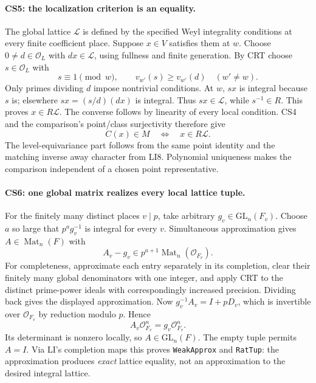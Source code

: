 \documentclass[11pt,a4paper]{article}
\numberwithin{equation}{section}
\theoremstyle{remark}\newtheorem{remark}[theorem]{Remark}
\begin{document}
\paragraph{CS5: the localization criterion is an equality.}
The global lattice $\mathcal L$ is defined by the specified Weyl
integrality conditions at every finite coefficient place. Suppose
$x\in V$ satisfies them at $w$. Choose $0\ne d\in\mathcal O_L$
with $dx\in\mathcal L$, using fullness and finite generation.
By CRT choose $s\in\mathcal O_L$ with
\[
 s\equiv1\pmod w,\qquad
 v_{w'}(s)\ge v_{w'}(d)\quad(w'\ne w).                 \tag{CS.7}
\]
Only primes dividing $d$ impose nontrivial conditions. At $w$, $sx$
is integral because $s$ is; elsewhere $sx=(s/d)(dx)$ is integral.
Thus $sx\in\mathcal L$, while $s^{-1}\in R$. This proves
$x\in R\mathcal L$. The converse follows by linearity of every
local condition. CS4 and the comparison's point/class surjectivity
therefore give
\[
 \boxed{\ C(x)\in M\quad\Longleftrightarrow\quad
                         x\in R\mathcal L.\ }          \tag{CS.8}
\]
The level-equivariance part follows from the same point identity and
the matching inverse away character from LI8. Polynomial uniqueness
makes the comparison independent of a chosen point representative.

\paragraph{CS6: one global matrix realizes every local lattice tuple.}
For the finitely many distinct places $v\mid p$, take arbitrary
$g_v\in\mathrm{GL}_n(F_v)$. Choose $a$ so large that
$p^a g_v^{-1}$ is integral for every $v$. Simultaneous approximation
gives $A\in\operatorname{Mat}_n(F)$ with
\[
 A_v-g_v\in p^{a+1}\operatorname{Mat}_n(\mathcal O_{F_v}).
\]
For completeness, approximate each entry separately in its completion,
clear their finitely many global denominators with one integer, and
apply CRT to the distinct prime-power ideals with correspondingly
increased precision. Dividing back gives the displayed approximation.
Now $g_v^{-1}A_v=I+pD_v$, which is invertible over
$\mathcal O_{F_v}$ by reduction modulo $p$. Hence
\[
 A_v\mathcal O_{F_v}^{n}=g_v\mathcal O_{F_v}^{n}.    \tag{CS.9}
\]
Its determinant is nonzero locally, so $A\in\mathrm{GL}_n(F)$.
The empty tuple permits $A=I$. Via LI's completion maps this proves
\texttt{WeakApprox} and \texttt{RatTup}: the approximation produces
\emph{exact} lattice equality, not an approximation to the desired
integral lattice.
\end{document}
